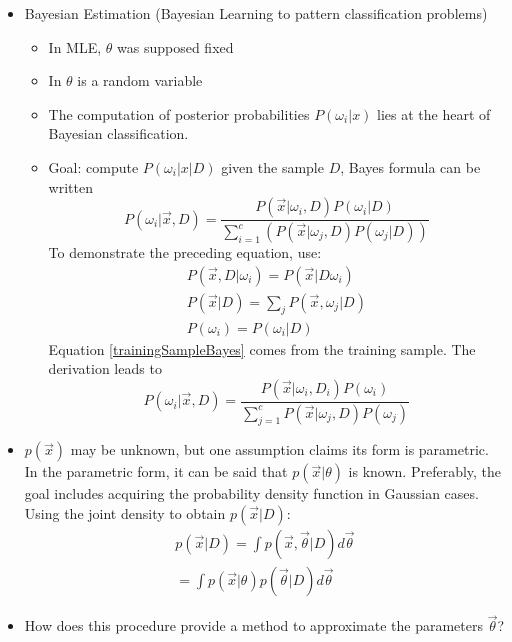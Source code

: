 \begin{itemize}
	\item Bayesian Estimation (Bayesian Learning to pattern classification problems)
	\begin{itemize}
		\item In MLE, $\theta$ was supposed fixed
		\item In $\theta$ is a random variable
		\item The computation of posterior probabilities $P(\omega_i | x)$ lies at the heart of Bayesian classification.
		\item Goal: compute $P(\omega_i | x | D)$ given the sample $D$, Bayes formula can be written \cite[91]{posteriorProbabilities}
		\begin{equation}
			P(\omega_i | \vec{x} , D) = \frac{P ( \vec{x}| \omega_i, D  ) P(\omega_i | D)} {\sum_{i=1}^c (P(\vec{x}| \omega_j, D) P(\omega_j |D)  ) }
		\end{equation}
		To demonstrate the preceding equation, use:
		\begin{eqnarray}
			P(\vec{x}, D | \omega_i) = P(\vec{x} | D\omega_i) \\
			P( \vec{x} |D ) = \sum_j P(\vec{x}, \omega_j | D) \\
			P(\omega_i) = P(\omega_i | D) \label{trainingSampleBayes}
		\end{eqnarray}
		Equation \ref{trainingSampleBayes} comes from the training sample.  The derivation leads to 
		\begin{equation}
			P(\omega_i | \vec{x}, D) = \frac{P ( \vec{x} | \omega_i , D_i) P(\omega_i) } {\sum_{j=1}^c P(\vec{x} | \omega_j , D) P(\omega_j)}
		\end{equation}
		
	\end{itemize}
	\item $p(\vec{x})$ may be unknown, but one assumption claims its form is parametric.  In the parametric form, it can be said that  $p(\vec{x}| \theta)$ is known.   Preferably, the goal includes acquiring the probability density function in Gaussian cases.  Using the joint density to obtain $p(\vec{x} | D)$: 
	\begin{eqnarray}
		p( \vec{x} | D) = \int p( \vec{x} , \vec{\theta} | D ) d \vec{\theta} \\
		= \int p( \vec{x} | \theta) p( \vec{\theta} | D) d \vec{\theta}
	\end{eqnarray}
	\item How does this procedure provide a method to approximate the parameters $\vec{\theta}$? \cite[92]{duda-hart-stork}
\end{itemize}


